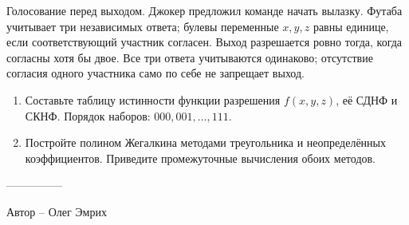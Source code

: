 \question
Голосование перед выходом. Джокер предложил команде начать вылазку. Футаба учитывает три независимых ответа; булевы переменные $x,y,z$ равны единице, если соответствующий участник согласен. Выход разрешается ровно тогда, когда согласны хотя бы двое. Все три ответа учитываются одинаково; отсутствие согласия одного участника само по себе не запрещает выход.
\begin{enumerate}
\item Составьте таблицу истинности функции разрешения $f(x,y,z)$, её СДНФ и СКНФ. Порядок наборов: $000,001,\ldots,111$.
\item Постройте полином Жегалкина методами треугольника и неопределённых коэффициентов. Приведите промежуточные вычисления обоих методов.
\end{enumerate}

---------------

Автор -- Олег Эмрих
